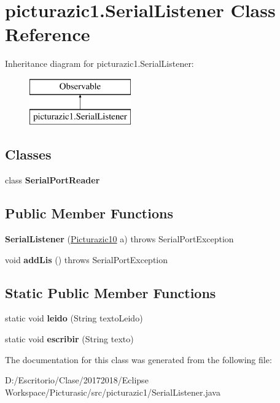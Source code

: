 \hypertarget{classpicturazic1_1_1_serial_listener}{}\section{picturazic1.\+Serial\+Listener Class Reference}
\label{classpicturazic1_1_1_serial_listener}
Inheritance diagram for picturazic1.\+Serial\+Listener\+:\begin{figure}[H]
\begin{center}
\leavevmode
\includegraphics[height=2.000000cm]{classpicturazic1_1_1_serial_listener}
\end{center}
\end{figure}
\subsection*{Classes}
\begin{DoxyCompactItemize}
\item 
class {\bfseries Serial\+Port\+Reader}
\end{DoxyCompactItemize}
\subsection*{Public Member Functions}
\begin{DoxyCompactItemize}
\item 
\mbox{\label{classpicturazic1_1_1_serial_listener_a30ddb0a9805bb37a5e63f4bbbec3a3a3}} 
{\bfseries Serial\+Listener} (\mbox{\hyperlink{classpicturazic1_1_1_picturazic10}{Picturazic10}} a)  throws Serial\+Port\+Exception 
\item 
\mbox{\label{classpicturazic1_1_1_serial_listener_a28d7e5c2656d6af44622d91c3423915b}} 
void {\bfseries add\+Lis} ()  throws Serial\+Port\+Exception 
\end{DoxyCompactItemize}
\subsection*{Static Public Member Functions}
\begin{DoxyCompactItemize}
\item 
\mbox{\label{classpicturazic1_1_1_serial_listener_a2683a715f60b1c01938fdfc04b98d236}} 
static void {\bfseries leido} (String texto\+Leido)
\item 
\mbox{\label{classpicturazic1_1_1_serial_listener_a6066df8dee153fc3e406f5951610a954}} 
static void {\bfseries escribir} (String texto)
\end{DoxyCompactItemize}


The documentation for this class was generated from the following file\+:\begin{DoxyCompactItemize}
\item 
D\+:/\+Escritorio/\+Clase/20172018/\+Eclipse Workspace/\+Picturasic/src/picturazic1/Serial\+Listener.\+java\end{DoxyCompactItemize}
